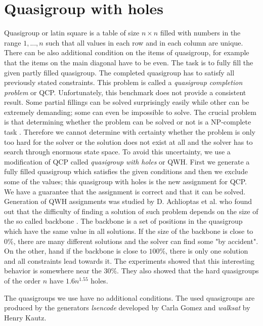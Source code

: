 \section{Quasigroup with holes}
Quasigroup or latin square is a table of size $n \times n$ filled with numbers in the
range $1,...,n$ such that all values in each row and in each column are unique. There
can be also additional condition on the items of quasigroup, for example that the 
items on the main diagonal have to be even. The task is to fully fill the 
given partly filled quasigroup. The completed quasigroup has to satisfy all previously
stated constraints. This problem is called a {\em quasigroup completion problem} or QCP.
Unfortunately, this benchmark does not provide a consistent result. Some partial fillings
can be solved surprisingly easily while other can be extremely demanding; 
some can even be impossible to solve. The crucial problem is that determining whether the problem can
be solved or not is a NP-complete task \cite{Achlioptas00generatingsatisfiable}. Therefore we cannot determine with certainty whether the problem is only
too hard for the solver or the solution does not exist at all and the solver has to search 
through enormous state space. To avoid this uncertainty, we use a modification of
QCP called {\em quasigroup with holes} or QWH. First we generate a fully filled quasigroup
which satisfies the given conditions and then we exclude some of the values; this quasigroup
with holes is the new assignment for QCP. We have a guarantee that the assignment is correct
and that it can be solved. Generation of QWH assignments was studied by D. Achlioptas
et al. who found out that the difficulty of finding a solution of such problem depends on the size of the
so called backbone \cite{Achlioptas00generatingsatisfiable}. The backbone is a set 
of positions in the quasigroup which have the same value in all solutions.
If the size of the backbone is close to $0 \%$, there are many different solutions and
the solver can find some "by accident". On the other, hand if the backbone is close
to $100 \%$, there is only one solution and all constraints lead towards it.
The experiments \cite{Achlioptas00generatingsatisfiable} showed that this interesting 
behavior is somewhere near the $30 \%$. They also showed that the hard quasigroups of the order
 $n$ have $1.6 n^{1.55}$ holes.


The quasigroups we use have no additional conditions. The used quasigroups are produced
by the generators {\em lsencode} developed by Carla Gomez and {\em walksat} by Henry Kautz. 
 
